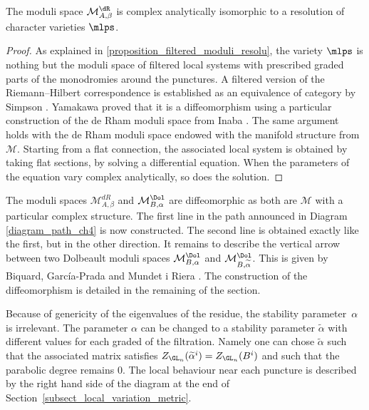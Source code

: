 \begin{theorem}
The moduli space $\mathcal{M}^{\dR}_{A,\beta}$ is complex analytically isomorphic to a resolution of character varieties $\mlps$.
\end{theorem}
\begin{proof}
As explained in \ref{proposition_filtered_moduli_resolu}, the variety $\mlps$ is nothing but the moduli space of filtered local systems with prescribed graded parts of the monodromies around the punctures. A filtered version of the Riemann--Hilbert correspondence is established as an equivalence of category by Simpson \cite{Simpson}. Yamakawa \cite{Yamakawa} proved that it is a diffeomorphism using a particular construction of the de Rham moduli space from Inaba \cite{Inaba13}. The same argument holds with the de Rham moduli space endowed with the manifold structure from $\mathcal{M}$. Starting from a flat connection, the associated local system is obtained by taking flat sections, \ie by solving a differential equation. When the parameters of the equation vary complex analytically, so does the solution.
\end{proof}

The moduli spaces $\mathcal{M}^{dR}_{A,\beta}$ and $\mathcal{M}^{\Dol}_{B,\alpha}$ are diffeomorphic as both are $\mathcal{M}$ with a particular complex structure. The first line in the path announced in Diagram \ref{diagram_path_ch4} is now constructed. The second line is obtained exactly like the first, but in the other direction. It remains to describe the vertical arrow between two Dolbeault moduli spaces $\mathcal{M}^{\Dol}_{B,\alpha}$ and $\mathcal{M}^{\Dol}_{B,\widetilde{\alpha}}$. This is given by Biquard, García-Prada and Mundet i Riera \cite[Th.\,7.10]{Biquard_Garcia_Prada_Riera}. The construction of the diffeomorphism is detailed in the remaining of the section.

Because of genericity of the eigenvalues of the residue, the stability parameter~$\alpha$ is irrelevant. The parameter $\alpha$ can be changed to a stability parameter $\widetilde{\alpha}$ with different values for each graded of the filtration. Namely one can chose $\widetilde{\alpha}$ such that the associated matrix satisfies $Z_{\GL_n}(\widetilde{\alpha}^{i})=Z_{\GL_n}(B^i)$ and such that the parabolic degree remains $0$. The local behaviour near each puncture is described by the right hand side of the diagram at the end of Section~\ref{subsect_local_variation_metric}.

